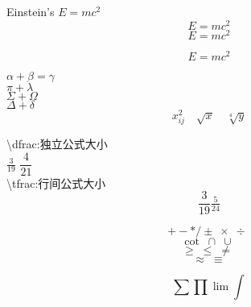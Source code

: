 \documentclass{article}
\begin{document}
Einstein's $E=mc^2$
\[E=mc^2\]
\[\boxed{E=mc^2}\]

	\begin{equation}
		E=mc^2
	\end{equation}

$\alpha+\beta=\gamma$\\
$\pi+\lambda$\\
$\Sigma+\Omega$\\
$\Delta+\delta$\\

\[x^2_{ij}\quad \sqrt{x}\quad \sqrt[4]{y}\]

\textbackslash dfrac:独立公式大小\\
$\frac{3}{19}$
$\dfrac{4}{21}$\\

\textbackslash tfrac:行间公式大小\\
\[\frac{3}{19}\tfrac{5}{24}\]

\[+-*/\pm\; \times\; \div\;\]
\[\cot\; \cap\; \cup\;  \]
\[\geq\; \leq\; \neq\; \]
\[\approx\; \equiv \]        

\[\sum \prod \lim \int\]

                                                                                                                  
\end{document}
